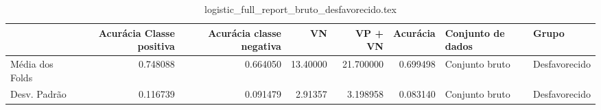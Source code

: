 \begin{table}
\centering
\caption{logistic_full_report_bruto_desfavorecido.tex}
\label{logistic_full_report_bruto_desfavorecido.tex}
\begin{tabular}{lrrrrrll}
\toprule
{} &  Acurácia Classe positiva &  Acurácia classe negativa &       VN  &   VP + VN  &  Acurácia & Conjunto de dados &          Grupo \\
\midrule
Média dos Folds &                  0.748088 &                  0.664050 &  13.40000 &  21.700000 &  0.699498 &    Conjunto bruto &  Desfavorecido \\
Desv. Padrão    &                  0.116739 &                  0.091479 &   2.91357 &   3.198958 &  0.083140 &    Conjunto bruto &  Desfavorecido \\
\bottomrule
\end{tabular}
\end{table}
